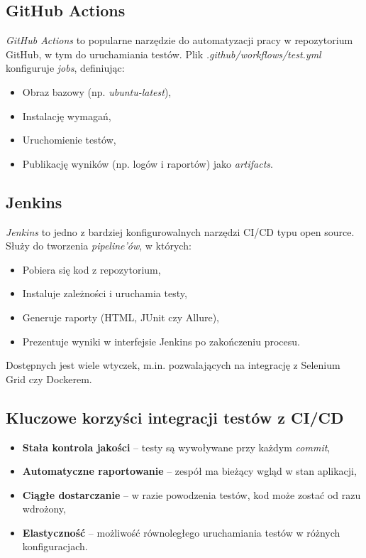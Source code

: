 \documentclass[12pt]{report}
\begin{document}
\subsection*{GitHub Actions}
\emph{GitHub Actions} to popularne narzędzie do automatyzacji pracy w repozytorium GitHub, w tym do uruchamiania testów. Plik \emph{.github/workflows/test.yml} konfiguruje \emph{jobs}, definiując:
\begin{itemize}
    \item Obraz bazowy (np. \emph{ubuntu-latest}),
    \item Instalację wymagań,
    \item Uruchomienie testów,
    \item Publikację wyników (np. logów i raportów) jako \emph{artifacts}.
\end{itemize}

\subsection*{Jenkins}
\emph{Jenkins} to jedno z bardziej konfigurowalnych narzędzi CI/CD typu open source. Służy do tworzenia \emph{pipeline’ów}, w których:
\begin{itemize}
    \item Pobiera się kod z repozytorium,
    \item Instaluje zależności i uruchamia testy,
    \item Generuje raporty (HTML, JUnit czy Allure),
    \item Prezentuje wyniki w interfejsie Jenkins po zakończeniu procesu.
\end{itemize}
Dostępnych jest wiele wtyczek, m.in. pozwalających na integrację z Selenium Grid czy Dockerem.

\subsection*{Kluczowe korzyści integracji testów z CI/CD}
\begin{itemize}
    \item \textbf{Stała kontrola jakości} -- testy są wywoływane przy każdym \emph{commit},
    \item \textbf{Automatyczne raportowanie} -- zespół ma bieżący wgląd w stan aplikacji,
    \item \textbf{Ciągłe dostarczanie} -- w razie powodzenia testów, kod może zostać od razu wdrożony,
    \item \textbf{Elastyczność} -- możliwość równoległego uruchamiania testów w różnych konfiguracjach.
\end{itemize}
\end{document}
